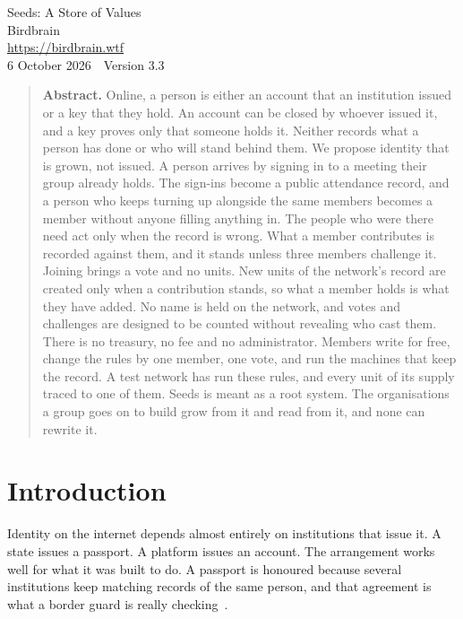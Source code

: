 \documentclass[11pt,a4paper]{article}
\begin{document}
\thispagestyle{plain}

\begin{center}
{\displayfont\LARGE\color{ink} Seeds: A Store of Values}\\[5mm]
{\normalsize Birdbrain}\\[0.5mm]
{\small\color{muted} \url{https://birdbrain.wtf}}\\[1mm]
{\small\color{muted} 6 October 2026 \,\textperiodcentered\, Version 3.3}
\end{center}

\vspace{2mm}
\begin{quote}
\small
\textbf{Abstract.} Online, a person is either an account that an institution issued or a key that they hold. An account can be closed by whoever issued it, and a key proves only that someone holds it. Neither records what a person has done or who will stand behind them. We propose identity that is grown, not issued. A person arrives by signing in to a meeting their group already holds. The sign-ins become a public attendance record, and a person who keeps turning up alongside the same members becomes a member without anyone filling anything in. The people who were there need act only when the record is wrong. What a member contributes is recorded against them, and it stands unless three members challenge it. Joining brings a vote and no units. New units of the network's record are created only when a contribution stands, so what a member holds is what they have added. No name is held on the network, and votes and challenges are designed to be counted without revealing who cast them. There is no treasury, no fee and no administrator. Members write for free, change the rules by one member, one vote, and run the machines that keep the record. A test network has run these rules, and every unit of its supply traced to one of them. Seeds is meant as a root system. The organisations a group goes on to build grow from it and read from it, and none can rewrite it.
\end{quote}

\section{Introduction}
\label{sec:intro}

Identity on the internet depends almost entirely on institutions that issue it. A state issues a passport. A platform issues an account. The arrangement works well for what it was built to do. A passport is honoured because several institutions keep matching records of the same person, and that agreement is what a border guard is really checking~\cite{passports}.
\end{document}
